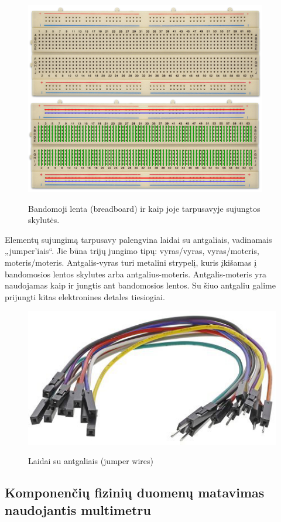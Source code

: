 \documentclass{VUMIFPSkursinis}
\begin{document}
\begin{figure}[h]
	\caption{Bandomoji lenta (breadboard) ir kaip joje tarpusavyje sujungtos skylutės.} 
	\centering
	\includegraphics{img/breadboard}\cite{8}
\end{figure}

Elementų sujungimą tarpusavy palengvina laidai su antgaliais, vadinamais „jumper'iais“. Jie būna trijų jungimo tipų: vyras/vyras, vyras/moteris, moteris/moteris. Antgalis-vyras turi metalini strypelį, kuris įkišamas į bandomosios lentos skylutes arba antgalius-moteris. Antgalis-moteris yra naudojamas kaip ir jungtis ant bandomosios lentos. Su šiuo antgaliu galime prijungti kitas elektronines detales tiesiogiai.\\

\begin{figure}[h]
	\caption{Laidai su antgaliais (jumper wires)} 
	\centering
	\includegraphics[scale=3]{img/jumperwire}\cite{9}
\end{figure}

\pagebreak


\subsection{Komponenčių fizinių duomenų matavimas naudojantis multimetru}
\end{document}
